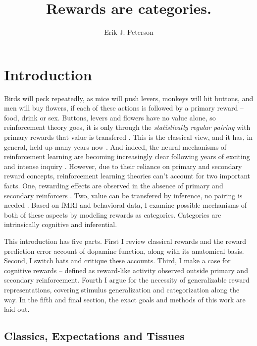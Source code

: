 \documentclass[doc,12pt]{apa}        %
\title{Rewards are categories.}
\author{Erik J. Peterson} \affiliation{Dept. of Psychology \\ Colorado State University \\ Fort Collins, CO}
\begin{document}
 
\maketitle
\doublespacing

\section{Introduction} %
\label{sec:introduction}
Birds will peck repeatedly, as mice will push levers, monkeys will hit buttons, and men will buy flowers, if each of these actions is followed by a primary reward -- food, drink or sex.  Buttons, levers and flowers have no value alone, so reinforcement theory goes, it is only through the \emph{statistically regular pairing} with primary rewards that value is transfered \cite{Rescorla:1988p8743}.  This is the classical view, and it has, in general, held up many years now \cite{iversen:2007aa}.  And indeed, the neural mechanisms of reinforcement learning are becoming increasingly clear following years of exciting and intense inquiry \cite{Glimcher:2011p8464, Montague:2006mz}.  However, due to their reliance on primary and secondary reward concepts, reinforcement learning theories can't account for two important facts.  One, rewarding effects are observed in the absence of primary and secondary reinforcers \cite{Hayden:2009p6545, Lohrenz:2007p7240, Tricomi:2008p6663, Jimura:2010p8305}. Two, value can be transfered by inference, no pairing is needed \cite{BrombergMartin:2010p7223, Hampton:2006p2577}.  Based on fMRI and behavioral data, I examine possible mechanisms of both of these aspects by modeling rewards as categories.  Categories are intrinsically cognitive and inferential.

This introduction has five parts.  First I review classical rewards and the reward prediction error account of dopamine function, along with its anatomical basis.  Second, I switch hats and critique these accounts. Third, I make a case for cognitive rewards -- defined as reward-like activity observed outside primary and secondary reinforcement. Fourth I argue for the necessity of generalizable reward representations, covering stimulus generalization and categorization along the way.  In the fifth and final section, the exact goals and methods of this work are laid out.

\subsection{Classics, Expectations and Tissues} %
\label{sub:cet}
\end{document}
